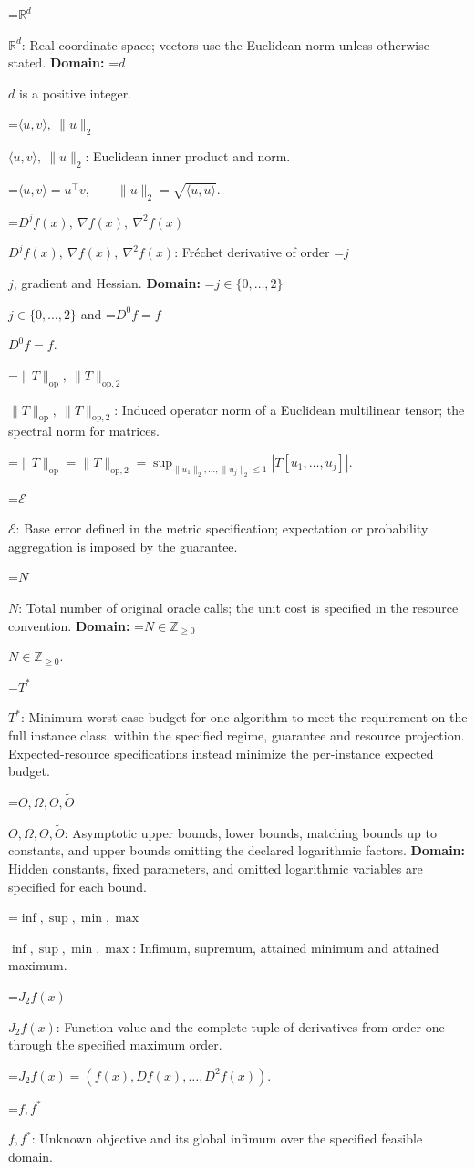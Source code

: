 \documentclass[10pt,a4paper]{article}
\newcommand{\AtlasMath}[1]{\par\begingroup\centering\setbox0=\hbox{$\displaystyle #1$}\ifdim\wd0>1.4\linewidth\typeout{ATLAS WIDE FORMULA: \the\wd0}\fi\ifdim\wd0>\linewidth\resizebox{\linewidth}{!}{\box0}\else\box0\fi\par\endgroup}
\newcommand{\AtlasInlineMath}[1]{\begingroup\setbox0=\hbox{$#1$}\ifdim\wd0>.4\linewidth\endgroup\AtlasMath{#1}\else\endgroup$#1$\fi}
\begin{document}
\AtlasInlineMath{\mathbb{R}^d}: Real coordinate space; vectors use the Euclidean norm unless otherwise stated. \textbf{Domain:} \AtlasInlineMath{d} is a positive integer.

\AtlasInlineMath{\langle u,v\rangle,\ \|u\|_2}: Euclidean inner product and norm.


\AtlasMath{\langle u,v\rangle=u^\top v,\qquad\|u\|_2=\sqrt{\langle u,u\rangle}.}


\AtlasInlineMath{D^jf(x),\ \nabla f(x),\ \nabla^2f(x)}: Fréchet derivative of order \AtlasInlineMath{j}, gradient and Hessian. \textbf{Domain:} \AtlasInlineMath{j\in\{0,\ldots,2\}} and \AtlasInlineMath{D^0f=f}.

\AtlasInlineMath{\|T\|_{\mathrm{op}},\ \|T\|_{\mathrm{op},2}}: Induced operator norm of a Euclidean multilinear tensor; the spectral norm for matrices.


\AtlasMath{\|T\|_{\mathrm{op}}=\|T\|_{\mathrm{op},2}=\sup_{\|u_1\|_2,\ldots,\|u_j\|_2\le1}|T[u_1,\ldots,u_j]|.}


\AtlasInlineMath{\mathcal{E}}: Base error defined in the metric specification; expectation or probability aggregation is imposed by the guarantee.

\AtlasInlineMath{N}: Total number of original oracle calls; the unit cost is specified in the resource convention. \textbf{Domain:} \AtlasInlineMath{N\in\mathbb{Z}_{\ge0}}.

\AtlasInlineMath{T^*}: Minimum worst-case budget for one algorithm to meet the requirement on the full instance class, within the specified regime, guarantee and resource projection. Expected-resource specifications instead minimize the per-instance expected budget.

\AtlasInlineMath{O,\Omega,\Theta,\widetilde{O}}: Asymptotic upper bounds, lower bounds, matching bounds up to constants, and upper bounds omitting the declared logarithmic factors. \textbf{Domain:} Hidden constants, fixed parameters, and omitted logarithmic variables are specified for each bound.

\AtlasInlineMath{\inf,\sup,\min,\max}: Infimum, supremum, attained minimum and attained maximum.

\AtlasInlineMath{J_{2}f(x)}: Function value and the complete tuple of derivatives from order one through the specified maximum order.


\AtlasMath{J_{2}f(x)=(f(x),Df(x),\ldots,D^{2}f(x)).}


\AtlasInlineMath{f,f^*}: Unknown objective and its global infimum over the specified feasible domain.
\end{document}
